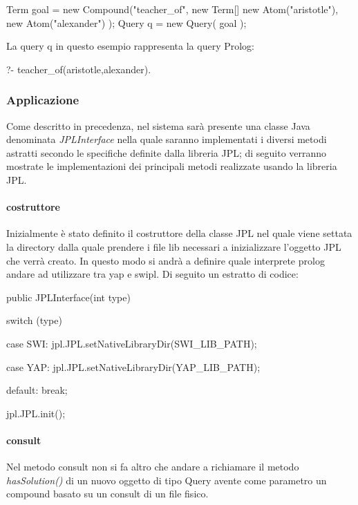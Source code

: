 \begin{javacode}
	Term goal = new Compound("teacher_of",
	  new Term[] {
		  new Atom("aristotle"),
		  new Atom("alexander")
		  }
	  );
	Query q = new Query( goal );
\end{javacode}

La query q in questo esempio rappresenta la query Prolog:

\begin{prologcode}
	?- teacher_of(aristotle,alexander).
\end{prologcode}

\subsubsection{Applicazione}
Come descritto in precedenza, nel sistema sarà presente una classe Java denominata \emph{JPLInterface} nella quale saranno implementati i diversi metodi astratti secondo le specifiche definite dalla libreria JPL; di seguito verranno mostrate le implementazioni dei principali metodi realizzate usando la libreria JPL.
\paragraph{costruttore}
Inizialmente è stato definito il costruttore della classe JPL nel quale viene settata la directory dalla quale prendere i file lib necessari a inizializzare l'oggetto JPL che verrà creato. In questo modo si andrà a definire quale interprete prolog andare ad utilizzare tra yap e swipl. Di seguito un estratto di codice:

\begin{javacode}
  public JPLInterface(int type) {
  
    switch (type) {
  
      case SWI:
      jpl.JPL.setNativeLibraryDir(SWI_LIB_PATH);
      
      case YAP:
      jpl.JPL.setNativeLibraryDir(YAP_LIB_PATH);
      
      default:
      break;
    }
    jpl.JPL.init();
  }
\end{javacode}

\paragraph{consult}
Nel metodo consult non si fa altro che andare a richiamare il metodo \emph{hasSolution()} di un nuovo oggetto di tipo Query avente come parametro un compound basato su un consult di un file fisico.

